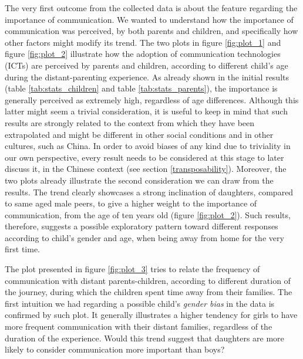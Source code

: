 The very first outcome from the collected data is about the feature regarding the importance of communication. We wanted to understand how the importance of communication was perceived, by both parents and children, and specifically how other factors might modify its trend. The two plots in figure \ref{fig:plot_1} and figure \ref{fig:plot_2} illustrate how the adoption of communication technologies (ICTs) are perceived by parents and children, according to different child's age during the distant-parenting experience. As already shown in the initial results (table \ref{tab:stats_children} and table \ref{tab:stats_parents}), the importance is generally perceived as extremely high, regardless of age differences. Although this latter might seem a trivial consideration, it is useful to keep in mind that such results are strongly related to the context from which they have been extrapolated and might be different in other social conditions and in other cultures, such as China. In order to avoid biases of any kind due to triviality in our own perspective, every result needs to be considered at this stage to later discuss it, in the Chinese context (see section \ref{transposability}).
Moreover, the two plots already illustrate the second consideration we can draw from the results. The trend clearly showcases a strong inclination of daughters, compared to same aged male peers, to give a higher weight to the importance of communication, from the age of ten years old (figure \ref{fig:plot_2}). Such results, therefore, suggests a possible exploratory pattern toward different responses according to child's gender and age, when being away from home for the very first time. 

The plot presented in figure \ref{fig:plot_3} tries to relate the frequency of communication with distant parents-children, according to different duration of the journey, during which the children spent time away from their families. The first intuition we had regarding a possible child's \textit{gender bias} in the data is confirmed by such plot. It generally illustrates a higher tendency for girls to have more frequent communication with their distant families, regardless of the duration of the experience. Would this trend suggest that daughters are more likely to consider communication more important than boys?

